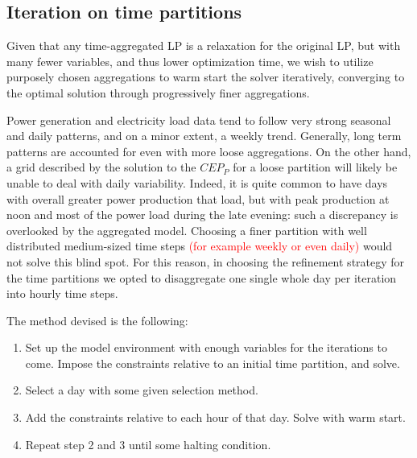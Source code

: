 








\subsection{Iteration on time partitions}

Given that any time-aggregated LP is a relaxation for the original LP, but with many fewer variables, and thus lower optimization time, we wish to utilize purposely chosen aggregations to warm start the solver iteratively, converging to the optimal solution through progressively finer aggregations.

Power generation and electricity load data tend to follow very strong seasonal and daily patterns, and on a minor extent, a weekly trend.
Generally, long term patterns are accounted for even with more loose aggregations. 
On the other hand, a grid described by the solution to the $CEP_{P}$ for a loose partition will likely be unable to deal with daily variability. 
Indeed, it is quite common to have days with overall greater power production that load, but with peak production at noon and most of the power load during the late evening: such a discrepancy is overlooked by the aggregated model. 
Choosing a finer partition with well distributed medium-sized time steps \textcolor{red}{(for example weekly or even daily)} would not solve this blind spot. 
For this reason, in choosing the refinement strategy for the time partitions we opted to disaggregate one single whole day per iteration into hourly time steps.

The method devised is the following:
\begin{enumerate}\label{time-iter-alg}
\item Set up the model environment with enough variables for the iterations to come. Impose the constraints relative to an initial time partition, and solve.
\item Select a day with some given selection method.
\item Add the constraints relative to each hour of that day. Solve with warm start.
\item Repeat step 2 and 3 until some halting condition.
\end{enumerate}

